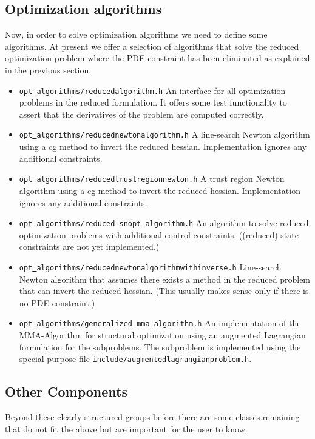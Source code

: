 \documentclass[prodmode,acmtoms]{acmsmall}
\numberwithin{equation}{section}
\begin{document}
\subsection{Optimization algorithms}
Now, in order to solve optimization algorithms we need to define some algorithms.
At present we offer a selection of algorithms that solve the reduced optimization 
problem where the PDE constraint has been eliminated as explained in the previous section.
\begin{itemize}
\item \texttt{opt\underline{ }algorithms/reducedalgorithm.h} An interface for all 
  optimization problems in the reduced formulation. It offers some test functionality
  to assert that the derivatives of the problem are computed correctly.
\item \texttt{opt\underline{ }algorithms/reducednewtonalgorithm.h}
  A line-search Newton algorithm using a cg method to invert the reduced hessian. 
  Implementation ignores any additional constraints.
\item \texttt{opt\underline{ }algorithms/reducedtrustregionnewton.h}
  A trust region Newton algorithm using a cg method to invert the reduced hessian.
  Implementation ignores any additional constraints.
\item \texttt{opt\underline{ }algorithms/reduced\underline{ }snopt\underline{ }algorithm.h}
  An algorithm to solve reduced optimization problems with additional control constraints.
  ((reduced) state constraints are not yet implemented.)
\item \texttt{opt\underline{ }algorithms/reducednewtonalgorithmwithinverse.h}
  Line-search Newton algorithm that assumes there exists a method in the reduced problem
  that can invert the reduced hessian. (This usually makes sense only if there is no 
  PDE constraint.)
\item \texttt{opt\underline{ }algorithms/generalized\underline{ }mma\underline{ }algorithm.h}
  An implementation of the MMA-Algorithm for structural optimization using an augmented
  Lagrangian formulation for the subproblems. The subproblem is implemented using the 
  special purpose file
  \texttt{include/augmentedlagrangianproblem.h}.
\end{itemize} 

\subsection{Other Components}
Beyond these clearly structured groups before there are some classes remaining that
do not fit the above but are important for the user to know.
\end{document}
